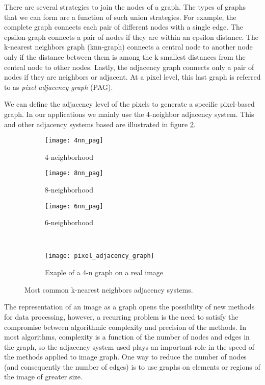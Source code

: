 There are several strategies to join the nodes of a graph. The types of graphs that we can form are a function of such union strategies. For example, the complete graph connects each pair of different nodes with a single edge. The epsilon-graph connects a pair of nodes if they are within an epsilon distance. The k-nearest neighbors graph (knn-graph) connects a central node to another node only if the distance between them is among the k smallest distances from the central node to other nodes. Lastly, the adjacency graph connects only a pair of nodes if they are neighbors or adjacent. At a pixel level, this last graph is referred to as \textit{pixel adjacency graph} (PAG).

We can define the adjacency level of the pixels to generate a specific pixel-based graph. In our applications we mainly use the 4-neighbor adjacency system. This and other adjacency systems based are illustrated in figure \ref{fig:pixel_adjacency_graph}.


\begin{figure}[!ht]
    \centering

	\begin{subfigure}[b]{0.2\textwidth}
    	\texttt{[image: 4nn\_pag]}
        \caption{ 4-neighborhood}
    \end{subfigure}\qquad   
    \begin{subfigure}[b]{0.2\textwidth}
    	\texttt{[image: 8nn\_pag]}
        \caption{8-neighborhood}
    \end{subfigure}\qquad
    \begin{subfigure}[b]{0.23\textwidth}
    	\texttt{[image: 6nn\_pag]}
        \caption{6-neighborhood}
    \end{subfigure}\\[5ex]    
    \begin{subfigure}[b]{0.5\textwidth}
        \texttt{[image: pixel\_adjacency\_graph]}
        \caption{Exaple of a 4-n graph on a real image}
        \label{fig:pag_example}
    \end{subfigure}         
        	    
    \caption{Most common k-nearest neighbors adjacency systems.}\label{fig:pixel_adjacency_graph}    
\end{figure}

The representation of an image as a graph opens the possibility of new methods for data processing, however, a recurring problem is the need to satisfy the compromise between algorithmic complexity and precision of the methods. In most algorithms, complexity is a function of the number of nodes and edges in the graph, so the adjacency system used plays an important role in the speed of the methods applied to image graph. One way to reduce the number of nodes (and consequently the number of edges) is to use graphs on elements or regions of the image of greater size.

